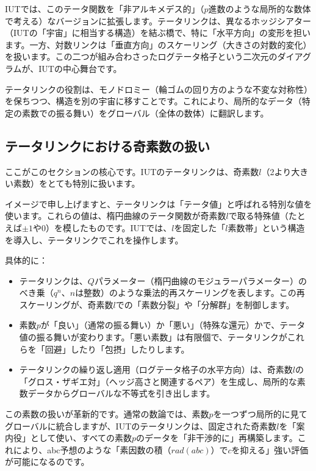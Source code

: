 \documentclass[dvipdfmx,12pt,a4paper]{jsarticle}
\begin{document}
IUTでは、このテータ関数を「非アルキメデス的」（$p$進数のような局所的な数体で考える）なバージョンに拡張します。テータリンクは、異なるホッジシアター（IUTの「宇宙」に相当する構造）を結ぶ橋で、特に「水平方向」の変形を担います。一方、対数リンクは「垂直方向」のスケーリング（大きさの対数的変化）を扱います。この二つが組み合わさったログテータ格子という二次元のダイアグラムが、IUTの中心舞台です。

テータリンクの役割は、モノドロミー（輪ゴムの回り方のような不変な対称性）を保ちつつ、構造を別の宇宙に移すことです。これにより、局所的なデータ（特定の素数での振る舞い）をグローバル（全体の数体）に翻訳します。

\subsection{テータリンクにおける奇素数の扱い}

ここがこのセクションの核心です。IUTのテータリンクは、奇素数$l$（2より大きい素数）をとても特別に扱います。

イメージで申し上げますと、テータリンクは「テータ値」と呼ばれる特別な値を使います。これらの値は、楕円曲線のテータ関数が奇素数$l$で取る特殊値（たとえば$\pm 1$や$0$）を模したものです。IUTでは、$l$を固定した「$l$素数帯」という構造を導入し、テータリンクでこれを操作します。

具体的に：
\begin{itemize}
  \item テータリンクは、$Q$パラメーター（楕円曲線のモジュラーパラメーター）のべき乗（$q^n$、$n$は整数）のような乗法的再スケーリングを表します。この再スケーリングが、奇素数$l$での「素数分裂」や「分解群」を制御します。
  \item 素数$p$が「良い」（通常の振る舞い）か「悪い」（特殊な還元）かで、テータ値の振る舞いが変わります。「悪い素数」は有限個で、テータリンクがこれらを「回避」したり「包摂」したりします。
  \item テータリンクの繰り返し適用（ログテータ格子の水平方向）は、奇素数$l$の「グロス・ザギエ対」（ヘッジ高さと関連するペア）を生成し、局所的な素数データからグローバルな不等式を引き出します。
\end{itemize}

この素数の扱いが革新的です。通常の数論では、素数$p$を一つずつ局所的に見てグローバルに統合しますが、IUTのテータリンクは、固定された奇素数$l$を「案内役」として使い、すべての素数$p$のデータを「非干渉的に」再構築します。これにより、abc予想のような「素因数の積（$rad(abc)$）で$c$を抑える」強い評価が可能になるのです。
\end{document}
